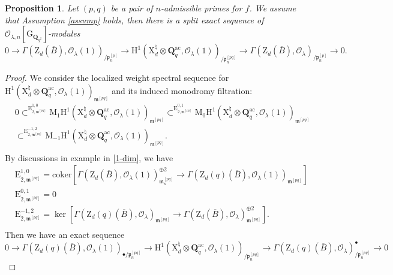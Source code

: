 \documentclass[10pt]{amsart}
\numberwithin{equation}{section}
\theoremstyle{plain}
\newtheorem{proposition}[theorem]{Proposition}
\numberwithin{equation}{section}
\theoremstyle{definition}
\theoremstyle{remark}
\def\coker{\mathrm{coker}}
\def\ac{\mathrm{ac}}
\def\frakm{\mathfrak{m}}
\def\ac{\mathrm{ac}}
\def\calO{\mathcal{O}}
\def\frakm{\mathfrak{m}}
\def\frakp{\mathfrak{p}}
\def\QQ{\mathbf{Q}}
\def\rmG{\mathrm{G}}
\def\rmH{\mathrm{H}}
\def\rmE{\mathrm{E}}
\def\rmM{\mathrm{M}}
\def\rmX{\mathrm{X}}
\def\rmZ{\mathrm{Z}}
\begin{document}
\begin{proposition}\label{split-2}
Let $(p,q)$ be a pair of $n$-admissible primes for $f$. We assume that Assumption \ref{assump} holds, then there is a split exact sequence of $\calO_{\lambda, n}[\rmG_{\QQ_{q^{2}}}]$-modules
\begin{equation*}
0\rightarrow \Gamma(\rmZ_{d}(\overline{B}), \calO_{\lambda}(1))_{/\frakp^{[p]}_{n}}\rightarrow \rmH^{1}(\rmX^{\natural}_{d}\otimes{\QQ^{\ac}_{q}}, \calO_{\lambda}(1))_{/\frakp^{[pq]}_{n}}\rightarrow \Gamma(\rmZ_{d}(\overline{B}), \calO_{\lambda})_{/\frakp^{[p]}_{n}}\rightarrow 0.
\end{equation*} 
\end{proposition}
\begin{proof}
We consider the localized weight spectral sequence for $\rmH^{1}(\rmX^{\natural}_{d}\otimes{\QQ^{\ac}_{q}}, \calO_{\lambda}(1))_{\frakm^{[pq]}}$ and its induced monodromy filtration:
\begin{equation}\label{mono}
\begin{aligned}
&0\subset^{\rmE^{1,0}_{2,\frakm^{[pq]}}} \rmM_{1}\rmH^{1}(\rmX^{\natural}_{d}\otimes{\QQ^{\ac}_{q}},\calO_{\lambda}(1))_{\frakm^{[pq]}}\subset^{\rmE^{0,1}_{2, \frakm^{[pq]}}} \rmM_{0}\rmH^{1}(\rmX^{\natural}_{d}\otimes{\QQ^{\ac}_{q}},\calO_{\lambda}(1))_{\frakm^{[pq]}}\\
&\subset^{\rmE^{-1,2}_{2, \frakm^{[pq]}}} \rmM_{-1}\rmH^{1}(\rmX^{\natural}_{d}\otimes{\QQ^{\ac}_{q}},\calO_{\lambda}(1))_{\frakm^{[pq]}}.\\
\end{aligned}
\end{equation}
By discussions in example in \ref{1-dim},  we have 
\begin{equation*}
\begin{aligned}
&\rmE^{1,0}_{2,\frakm^{[pq]}}= \coker[\Gamma(\rmZ_{d}(\overline{B}), \calO_{\lambda}(1))^{\oplus2}_{\frakm^{[pq]}_{n}}\rightarrow\Gamma(\rmZ_{d}(q)(\overline{B}), \calO_{\lambda}(1))_{\frakm^{[pq]}}]\\
&\rmE^{0,1}_{2, \frakm^{[pq]}}=0\\
&\rmE^{-1,2}_{2, \frakm^{[pq]}}=\ker[\Gamma(\rmZ_{d}(q)(\overline{B}), \calO_{\lambda})_{\frakm^{[pq]}}\rightarrow\Gamma(\rmZ_{d}(\overline{B}), \calO_{\lambda})^{\oplus2}_{\frakm^{[pq]}}].\\
\end{aligned}
\end{equation*}
Then we have an exact sequence 
\begin{equation*}
0\rightarrow\Gamma(\rmZ_{d}(q)(\overline{B}), \calO_{\lambda}(1))_{\bullet/\frakp^{[pq]}_{n}}\rightarrow\rmH^{1}(\rmX^{\natural}_{d}\otimes{\QQ^{\ac}_{q}}, \calO_{\lambda}(1))_{/\frakp^{[pq]}_{n}}\rightarrow\Gamma(\rmZ_{d}(q)(\overline{B}), \calO_{\lambda})^{\bullet}_{/\frakp^{[pq]}_{n}}\rightarrow 0

\end{equation*}
\end{proof}
\end{document}
